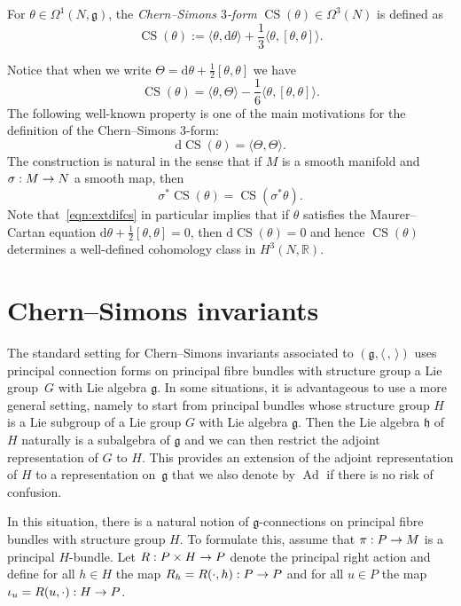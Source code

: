 \documentclass[AHL,Unicode,longabstracts]{cedram}
\renewcommand{\th}{\theta}
\newcommand{\Om}{\Omega}
\newcommand{\B}[2]{\langle#1,#2\rangle}
\DeclareMathOperator{\CS}{CS}
\DeclareMathOperator{\Ad}{Ad}
\renewcommand*{\d}{\mathrm{d}}
\newcommand*{\R}{\mathbb{R}}
\newcommand{\fkg}{\mathfrak{g}}
\newcommand{\fkh}{\mathfrak{h}}
\renewcommand*{\to}{\mathchoice{\longrightarrow}{\rightarrow}{\rightarrow}{\rightarrow}}
\newcommand*{\R}{\mathbb{R}}
\begin{document}
\begin{defi}\label{def:CS}
For $\theta\in\Om^1(N,\fkg)$, the \emph{Chern--Simons $3$-form} $\CS(\th)\in\Om^3(N)$ is defined as
\[
\CS(\th):=\B{\th}{\d\th}+\frac13 \B{\th}{[\th,\th]}.
\]
\end{defi}

Notice that when we write $\Theta=\d\theta+\frac{1}{2}[\theta,\theta]$ we have
\[
\CS(\theta)=\B{\theta}{\Theta}-\frac{1}{6}\B{\theta}{[\theta,\theta]}.
\]
The following well-known property is one of the main motivations for the definition of the Chern--Simons $3$-form:
\begin{equation}\label{eqn:extdifcs}
\d\CS(\th)=\B{\Theta}{\Theta}.
\end{equation}
The construction is natural in the sense that if $M$ is a smooth manifold and\linebreak $\sigma : M \to N$ a smooth map, then
\begin{equation}\label{eqn:cspullback}
\sigma^*\CS(\theta)=\CS(\sigma^*\theta).
\end{equation}
Note that~\eqref{eqn:extdifcs} in particular implies that if $\th$ satisfies the Maurer--Cartan equation $\d\th+\frac12[\th,\th]=0$, then $\d\CS(\th)=0$ and hence $\CS(\th)$ determines a well-defined cohomology class in $H^3(N,\R)$.

\section{Chern--Simons invariants}\label{1.3}

The standard setting for Chern--Simons invariants associated to $(\fkg,\B{\,}{\,})$ uses principal connection forms on principal fibre bundles with structure group a Lie group~$G$ with Lie algebra $\fkg$. In some situations, it is advantageous to use a more general setting, namely to start from principal bundles whose structure group $H$ is a Lie subgroup of a Lie group $G$ with Lie algebra $\fkg$. Then the Lie algebra $\fkh$ of $H$ naturally is a subalgebra of $\fkg$ and we can then restrict the adjoint representation of $G$ to $H$. This provides an extension of the adjoint representation of $H$ to a representation on~$\fkg$ that we also denote by $\Ad$ if there is no risk of confusion.

In this situation, there is a natural notion of $\fkg$-connections on principal fibre bundles with structure group $H$. To formulate this, assume that $\pi: P\to M$ is a principal $H$-bundle. Let $R : P \times H \to P$ denote the principal right action and define for all $h \in H$ the map $R_h=R(\cdot,h) : P
\to P$ and for all $u \in P$ the map $\iota_u=R(u,\cdot) : H \to P$.
\end{document}

